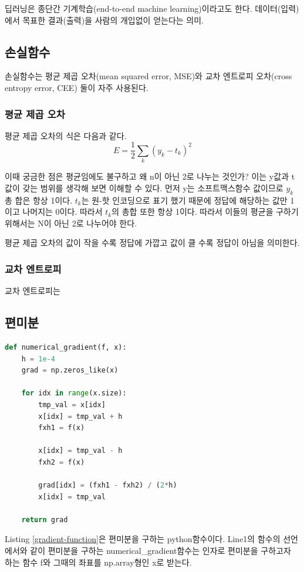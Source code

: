 \documentclass[12pt]{article}
\begin{document}
딥러닝은 종단간 기계학습(end-to-end machine learning)이라고도 한다. 데이터(입력)에서 목표한 결과(출력)을 사람의 개입없이 얻는다는 의미.

\subsection{손실함수}

손실함수는 평균 제곱 오차(mean squared error, MSE)와 교차 엔트로피 오차(cross entropy error, CEE) 둘이 자주 사용된다.
\subsubsection{평균 제곱 오차}
평균 제곱 오차의 식은 다음과 같다.
\[ E = \frac{1}{2} \sum_{k}(y_{k} - t_{k})^2  \]

이때 궁금한 점은 평균임에도 불구하고 왜 n이 아닌 2로 나누는 것인가? 이는 y값과 t값이 갖는 범위를 생각해 보면 이해할 수 있다. 먼저 y는 소프트맥스함수 값이므로 $y_{k}$ 총 합은 항상 1이다.
$t_{k}$는 원-핫 인코딩으로 표기 했기 때문에 정답에 해당하는 값만 1이고 나머지는 0이다. 따라서 $t_{k}$의 총합 또한 항상 1이다. 따라서 이들의 평균을 구하기 위해서는 N이 아닌 2로 나누어야 한다.

평균 제곱 오차의 값이 작을 수록 정답에 가깝고 값이 클 수록 정답이 아님을 의미한다.
	\subsubsection{교차 엔트로피}
	교차 엔트로피는 

\subsection{ 편미분}
\begin{lstlisting}[language=Python, caption={Python으로 구현한 편미분 함수},label=gradient-function]
def numerical_gradient(f, x):
	h = 1e-4
	grad = np.zeros_like(x)

	for idx in range(x.size):
		tmp_val = x[idx]
		x[idx] = tmp_val + h
		fxh1 = f(x)

		x[idx] = tmp_val - h
		fxh2 = f(x)

		grad[idx] = (fxh1 - fxh2) / (2*h)
		x[idx] = tmp_val

	return grad
\end{lstlisting}

Listing \ref{gradient-function}은 편미분을 구하는 python함수이다. Line1의 함수의 선언에서와 같이 편미분을 구하는 numerical\_gradient함수는 인자로 편미분을 구하고자 하는 함수 f와 그때의 좌표를 np.array형인 x로 받는다.
\end{document}
